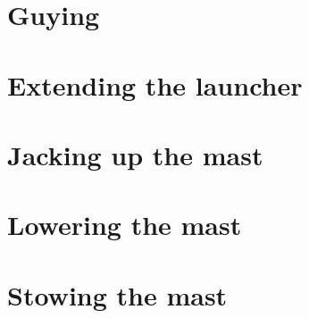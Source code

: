 \documentclass{article}
\begin{document}
\section{Guying}

\section{Extending the launcher}

\section{Jacking up the mast}

\section{Lowering the mast}

\section{Stowing the mast}
\end{document}

